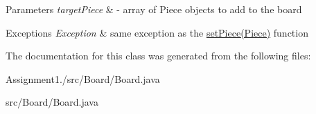 \begin{DoxyParams}{Parameters}
{\em target\-Piece} & -\/ array of Piece objects to add to the board \\
\hline
\end{DoxyParams}

\begin{DoxyExceptions}{Exceptions}
{\em Exception} & same exception as the \hyperlink{classBoard_1_1Board_aec610c37f3e800806daa464a45b48762}{set\-Piece(\-Piece)} function \\
\hline
\end{DoxyExceptions}


The documentation for this class was generated from the following files\-:\begin{DoxyCompactItemize}
\item 
Assignment1./src/\-Board/Board.\-java\item 
src/\-Board/Board.\-java\end{DoxyCompactItemize}
